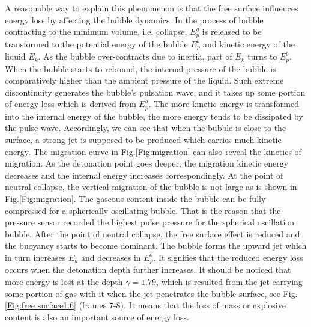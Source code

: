 \documentclass[%
 aip,
 amsmath,amssymb,
 reprint,%
]{revtex4-1}
\begin{document}
{A reasonable way to explain this phenomenon is that the free surface influences energy loss by affecting the bubble dynamics. 
In the process of bubble contracting to the minimum volume, i.e. collapse, $E_p^g$ is released to be transformed to the potential energy of the bubble $E_p^b$ and kinetic energy of the liquid $E_k$. As the bubble over-contracts due to inertia, part of $E_k$ turns to $E_p^b$. When the bubble starts to rebound, the internal pressure of the bubble is comparatively higher than the ambient pressure of the liquid. Such extreme discontinuity generates the bubble's pulsation wave, and it takes up some portion of energy loss which is derived from $E_p^b$. The more kinetic energy is transformed into the internal energy of the bubble, the more energy tends to be dissipated by the pulse wave. Accordingly, we can see that when the bubble is close to the surface, a strong jet is supposed to be produced which carries much kinetic energy. The migration curve in Fig.\ref{Fig:migration} can also reveal the kinetics of migration. As the detonation point goes deeper, the migration kinetic energy decreases and the internal energy increases correspondingly. At the point of neutral collapse, the vertical migration of the bubble is not large as is shown in Fig.\ref{Fig:migration}. The gaseous content inside the bubble can be fully compressed for a spherically oscillating bubble. That is the reason that the pressure sensor recorded the highest pulse pressure for the spherical oscillation bubble. After the point of neutral collapse, the free surface effect is reduced and the buoyancy starts to become dominant. The bubble forms the upward jet which in turn increases $E_k$ and decreases in $E_p^b$. It signifies that the reduced energy loss occurs when the detonation depth further increases. It should be noticed that more energy is lost at the depth $\gamma=1.79$, which is resulted from the jet carrying some portion of gas with it when the jet penetrates the bubble surface, see Fig.\ref{Fig:free surface1.6} (frames 7-8). It means that the loss of mass or explosive content is also an important source of energy loss.

}
\end{document}
